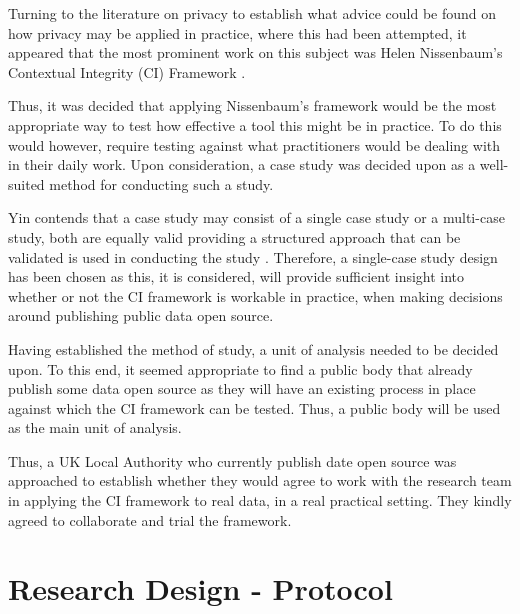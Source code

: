 Turning to the literature on privacy to establish what advice could be found on how privacy may be applied in practice, where this had been attempted, it appeared that the most prominent work on this subject was Helen Nissenbaum's Contextual Integrity (CI) Framework \citep{Nissenbaum_2010}.  %

Thus, it was decided that applying Nissenbaum's framework would be the most appropriate way to test how effective a tool this might be in practice. To do this would however, require testing against what practitioners would be dealing with in their daily work. Upon consideration, a case study was decided upon as a well-suited method for conducting such a study. 

Yin contends that a case study may consist of a single case study or a multi-case study, both are equally valid providing a structured approach that can be validated is used in conducting the study \citep{Yin_Case_studies_and_org_in_1985}. Therefore, a single-case study design has been chosen as this, it is considered, will provide sufficient insight into whether or not the CI framework is workable in practice, when making decisions around publishing public data open source.

Having established the method of study, a unit of analysis needed to be decided upon. To this end, it seemed appropriate to find a public body that already publish some data open source as they will have an existing process in place against which the CI framework can be tested. Thus, a public body will be used as the main unit of analysis. 

Thus, a UK Local Authority who currently publish date open source was approached to establish whether they would agree to work with the research team in applying the CI framework to real data, in a real practical setting. They kindly agreed to collaborate and trial the framework.  %

\section {Research Design - Protocol}

